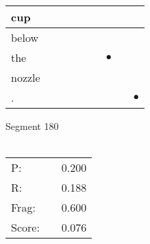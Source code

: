 \documentclass[landscape]{article}
\newcommand{\ssp}{\hspace{2pt}}
\newcommand{\mex}{\cellcolor{g}$\bullet$}
\begin{document}
\begin{tabular}{|l|p{10pt}|p{10pt}|p{10pt}|p{10pt}|p{10pt}|p{10pt}|p{10pt}|p{10pt}|}
\hline
\ssp cup \ssp&\hspace{2pt}&\hspace{2pt}&\hspace{2pt}&\hspace{2pt}&\hspace{2pt}&\hspace{2pt}&\hspace{2pt}&\hspace{2pt}\\
\hline
\ssp below \ssp&\hspace{2pt}&\hspace{2pt}&\hspace{2pt}&\hspace{2pt}&\hspace{2pt}&\hspace{2pt}&\hspace{2pt}&\hspace{2pt}\\
\hline
\ssp \cellcolor{ref5}the \ssp&\hspace{2pt}&\hspace{2pt}&\hspace{2pt}&\hspace{2pt}&\hspace{2pt}&\hspace{2pt}\mex&\hspace{2pt}&\hspace{2pt}\\
\hline
\ssp nozzle \ssp&\hspace{2pt}&\hspace{2pt}&\hspace{2pt}&\hspace{2pt}&\hspace{2pt}&\hspace{2pt}&\hspace{2pt}&\hspace{2pt}\\
\hline
\ssp \cellcolor{ref7}. \ssp&\hspace{2pt}&\hspace{2pt}&\hspace{2pt}&\hspace{2pt}&\hspace{2pt}&\hspace{2pt}&\hspace{2pt}&\hspace{2pt}\mex\\
\hline
\end{tabular}

\vspace{6pt}
\noindent Segment 180\\\\
\noindent\begin{tabular}{lm{12pt}r}
\hline
P:&&0.200\\
R:&&0.188\\
Frag:&&0.600\\
Score:&&0.076\\
\end{tabular}
\end{document}
